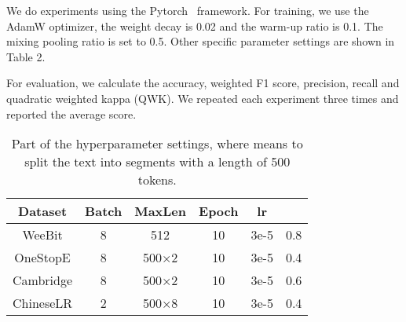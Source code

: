 \documentclass[11pt]{article}
\begin{document}
We do experiments using the Pytorch~\cite{paszke2019pytorch} framework. For training, we use the AdamW optimizer, the weight decay is 0.02 and the warm-up ratio is 0.1.
The mixing pooling ratio  is set to 0.5.
Other specific parameter settings are shown in Table 2.

For evaluation, we calculate the accuracy, weighted F1 score, precision, recall and quadratic weighted kappa (QWK). We repeated each experiment three times and reported the average score.



\begin{table}[htbp]
\centering
\small
\begin{tabular}{cccccc}
\hline
\textbf{Dataset} & \textbf{Batch} & \textbf{MaxLen} & \textbf{Epoch} & \textbf{lr} &  \\
\hline
WeeBit    & 8 & 512   & 10 & 3e-5 & 0.8 \\
OneStopE  & 8 & 500×2 & 10 & 3e-5 & 0.4 \\
Cambridge & 8 & 500×2 & 10 & 3e-5 & 0.6 \\
ChineseLR & 2 & 500×8 & 10 & 3e-5 & 0.4 \\
\hline
\end{tabular}
\caption{Part of the hyperparameter settings, where  means to split the text into  segments with a length of 500 tokens.}
\end{table}
\end{document}

